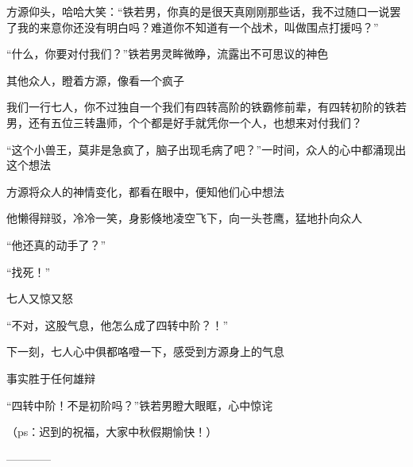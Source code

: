\begin{this_body}
方源仰头，哈哈大笑：“铁若男，你真的是很天真刚刚那些话，我不过随口一说罢了我的来意你还没有明白吗？难道你不知道有一个战术，叫做围点打援吗？”

“什么，你要对付我们？”铁若男灵眸微睁，流露出不可思议的神色

其他众人，瞪着方源，像看一个疯子

我们一行七人，你不过独自一个我们有四转高阶的铁霸修前辈，有四转初阶的铁若男，还有五位三转蛊师，个个都是好手就凭你一个人，也想来对付我们？

“这个小兽王，莫非是急疯了，脑子出现毛病了吧？”一时间，众人的心中都涌现出这个想法

方源将众人的神情变化，都看在眼中，便知他们心中想法

他懒得辩驳，冷冷一笑，身影倏地凌空飞下，向一头苍鹰，猛地扑向众人

“他还真的动手了？”

“找死！”

七人又惊又怒

“不对，这股气息，他怎么成了四转中阶？！”

下一刻，七人心中俱都咯噔一下，感受到方源身上的气息

事实胜于任何雄辩

“四转中阶！不是初阶吗？”铁若男瞪大眼眶，心中惊诧

（ps：迟到的祝福，大家中秋假期愉快！）

------------

\end{this_body}

